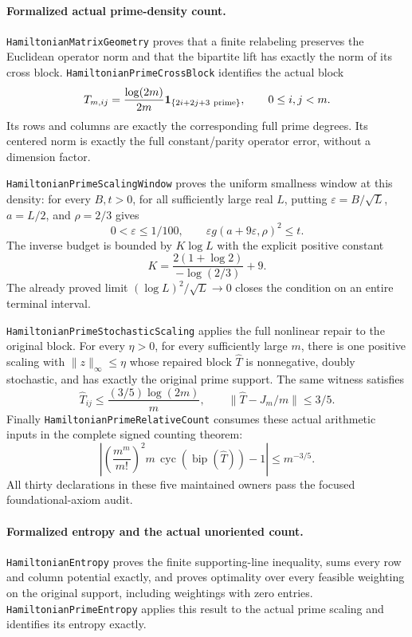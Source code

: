 \paragraph{Formalized actual prime-density count.}
\texttt{HamiltonianMatrixGeometry} proves that a finite relabeling
preserves the Euclidean operator norm and that the bipartite lift
has exactly the norm of its cross block.
\texttt{HamiltonianPrimeCrossBlock} identifies the actual block
\[
 T_{m,ij}=\frac{\log(2m)}{2m}
     {\bf1}_{\{2i+2j+3\ {\rm prime}\}},
 \qquad 0\leq i,j<m .
\]
Its rows and columns are exactly the corresponding full prime
degrees. Its centered norm is exactly the full constant/parity
operator error, without a dimension factor.

\texttt{HamiltonianPrimeScalingWindow} proves the uniform
smallness window at this density: for every \(B,t>0\), for all
sufficiently large real \(L\), putting
\(\varepsilon=B/\sqrt L\), \(a=L/2\), and \(\rho=2/3\) gives
\[
 0<\varepsilon\leq1/100,\qquad
 \varepsilon g(a+9\varepsilon,\rho)^2\leq t .
\]
The inverse budget is bounded by \(K\log L\) with the explicit
positive constant
\[
 K=\frac{2(1+\log2)}{-\log(2/3)}+9.
\]
The already proved limit \((\log L)^2/\sqrt L\to0\)
closes the condition on an entire terminal interval.

\texttt{HamiltonianPrimeStochasticScaling} applies the full
nonlinear repair to the original block. For every \(\eta>0\),
for every sufficiently large \(m\), there is one positive scaling
with \(\|z\|_\infty\leq\eta\) whose repaired block
\(\widehat T\) is nonnegative, doubly stochastic, and has exactly
the original prime support. The same witness satisfies
\[
 \widehat T_{ij}\leq\frac{(3/5)\log(2m)}m,\qquad
 \|\widehat T-J_m/m\|\leq3/5 .
\]
Finally \texttt{HamiltonianPrimeRelativeCount} consumes these
actual arithmetic inputs in the complete signed counting theorem:
\[
 \left|\left(\frac{m^m}{m!}\right)^2
       m\,\operatorname{cyc}(\operatorname{bip}(\widehat T))-1\right|
                       \leq m^{-3/5}.
\]
All thirty declarations in these five maintained owners pass the
focused foundational-axiom audit.
\paragraph{Formalized entropy and the actual unoriented count.}
\texttt{HamiltonianEntropy} proves the finite supporting-line
inequality, sums every row and column potential exactly, and
proves optimality over every feasible weighting on the original
support, including weightings with zero entries.
\texttt{HamiltonianPrimeEntropy} applies this result to the actual
prime scaling and identifies its entropy exactly.

